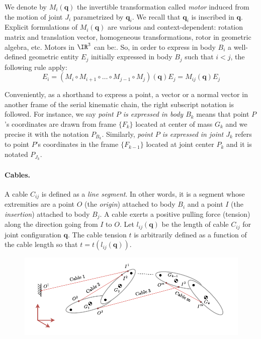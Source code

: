 We denote by $M_i(\mathbf{q})$ the invertible transformation called \emph{motor} induced from the motion of joint $J_i$ parametrized by $\mathbf{q}_i$. We recall that $\mathbf{q}_i$ is inscribed in $\mathbf{q}$. Explicit formulations of $M_i(\mathbf{q})$ are various and context-dependent: rotation matrix and translation vector, homogeneous transformations, rotor in geometric algebra, etc. Motors in $\IR^3$ can be:. So, in order to express in body $B_i$ a well-defined geometric entity $E_j$ initially expressed in body $B_j$ such that $i<j$, the following rule apply:
$$E_i = (M_i \circ M_{i+1} \circ \dots \circ M_{j-1} \circ M_j)(\mathbf{q})E_j = M_{ij}(\mathbf{q})E_j$$

Conveniently, as a shorthand to express a point, a vector or a normal vector in another frame of the serial kinematic chain, the right subscript notation is followed. For instance, we say \emph{point $P$ is expressed in body $B_k$} means that point $P$'s coordinates are drawn from frame $\{F_k\}$ located at center of mass $G_k$ and we precise it with the notation $P_{B_k}$. Similarly, \emph{point $P$ is expressed in joint $J_k$} refers to point $P$'s coordinates in the frame $\{F_{k-1}\}$ located at joint center $P_k$ and it is notated $P_{J_k}$.

\paragraph*{Cables.} A cable $C_{ij}$ is defined as a \emph{line segment}. In other words, it is a segment whose extremities are a point $O$ (the \emph{origin}) attached to body $B_i$ and a point $I$ (the \emph{insertion}) attached to body $B_j$. A cable exerts a positive pulling force (tension) along the direction going from $I$ to $O$. Let $l_{ij}(\mathbf{q})$ be the length of cable $C_{ij}$ for joint configuration $\mathbf{q}$. The cable tension $t$ is arbitrarily defined as a function of the cable length so that $t=t(l_{ij}(\mathbf{q}))$.
\begin{figure}[!htb]
    \captionsetup{justification=centering}
        \centering
        \includegraphics[trim={0 0 0 0},clip,width=1\linewidth]{img/chapter_4/cable_routing.pdf}
    \caption{}
    \label{fig:cable_routing}
\end{figure}

